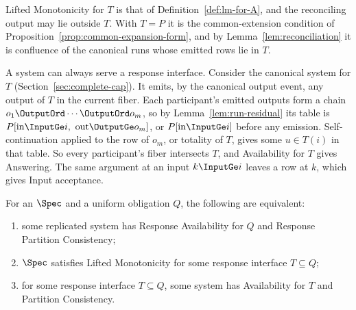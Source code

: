 Lifted Monotonicity for $T$ is that of Definition~\ref{def:lm-for-A}, and
the reconciling output may lie outside $T$.  With $T=P$ it is the
common-extension condition of Proposition~\ref{prop:common-expansion-form}, and
by Lemma~\ref{lem:reconciliation} it is confluence of the canonical runs whose
emitted rows lie in $T$.

A system can always serve a response interface.  Consider the canonical system
for $T$ (Section~\ref{sec:complete-cap}).  It emits, by the canonical output
event, any output of $T$ in the current fiber.  Each participant's emitted
outputs form a chain $o_1\OutputOrd\cdots\OutputOrd o_m$, so by
Lemma~\ref{lem:run-residual} its table is
$P[\mathrm{in}\InputGe i,\ \mathrm{out}\OutputGe o_m]$, or
$P[\mathrm{in}\InputGe i]$ before any emission.  Self-continuation applied to
the row of $o_m$, or totality of $T$, gives some $u\in T(i)$ in that table.
So every participant's fiber intersects $T$, and Availability for $T$ gives
Answering.  The same argument at an input $k\InputGe i$ leaves a row at $k$,
which gives Input acceptance.

\begin{theorem}
\label{thm:complete-cap-response}
For an \spectype $\Spec$ and a uniform obligation $Q$,
the following are equivalent:
\begin{enumerate}
  \item some replicated system has Response Availability for $Q$ and
        Response Partition Consistency;
  \item $\Spec$ satisfies Lifted Monotonicity for some response interface $T\subseteq Q$;
  \item for some response interface $T\subseteq Q$, some system has
        Availability for $T$ and Partition Consistency.
\end{enumerate}
\end{theorem}

